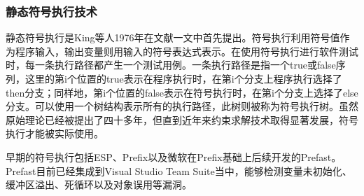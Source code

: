 
%

\subsubsection{静态符号执行技术}

静态符号执行是King等人1976年在文献一文中首先提出。符号执行利用符号值作为程序输入，输出变量则用输入的符号表达式表示。在使用符号执行进行软件测试时，每一条执行路径都产生一个测试用例。一条执行路径是指一个true或false序列，这里的第i个位置的true表示在程序执行时，在第i个分支上程序执行选择了then分支；同样地，第i个位置的false表示在符号执行时，在第i个分支上选择了else分支。可以使用一个树结构表示所有的执行路径，此树则被称为符号执行树。虽然原始理论已经被提出了四十多年，但直到近年来约束求解技术取得显著发展，符号执行才能被实际使用。

早期的符号执行包括ESP、Prefix以及微软在Prefix基础上后续开发的Prefast。Prefast目前已经集成到Visual Studio Team Suite当中，能够检测变量未初始化、缓冲区溢出、死循环以及对象误用等漏洞。


